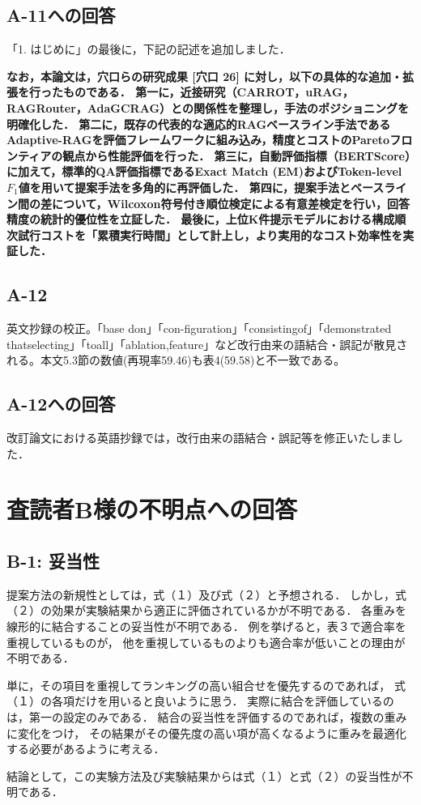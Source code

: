 \documentclass{jsarticle}
\begin{document}
\subsection*{A-11への回答}

「1. はじめに」の最後に，下記の記述を追加しました．

\textbf{なお，本論文は，穴口らの研究成果 [穴口 26] に対し，以下の具体的な追加・拡張を行ったものである．
第一に，近接研究（CARROT，uRAG，RAGRouter，AdaGCRAG）との関係性を整理し，手法のポジショニングを明確化した．
第二に，既存の代表的な適応的RAGベースライン手法であるAdaptive-RAGを評価フレームワークに組み込み，精度とコストのParetoフロンティアの観点から性能評価を行った．
第三に，自動評価指標（BERTScore）に加えて，標準的QA評価指標であるExact Match (EM)およびToken-level $F_1$値を用いて提案手法を多角的に再評価した．
第四に，提案手法とベースライン間の差について，Wilcoxon符号付き順位検定による有意差検定を行い，回答精度の統計的優位性を立証した．
最後に，上位K件提示モデルにおける構成順次試行コストを「累積実行時間」として計上し，より実用的なコスト効率性を実証した．}

\subsection*{A-12}
\begin{screen}
英文抄録の校正。「base don」「con-figuration」「consistingof」「demonstrated thatselecting」「toall」「ablation,feature」など改行由来の語結合・誤記が散見される。本文5.3節の数値(再現率59.46)も表4(59.58)と不一致である。
\end{screen}

\subsection*{A-12への回答}
改訂論文における英語抄録では，改行由来の語結合・誤記等を修正いたしました．

\newpage

\section*{査読者B様の不明点への回答}

\subsection*{B-1: 妥当性}
\begin{screen}
提案方法の新規性としては，式（１）及び式（２）と予想される．
しかし，式（２）の効果が実験結果から適正に評価されているかが不明である．
各重みを線形的に結合することの妥当性が不明である．
例を挙げると，表３で適合率を重視しているものが，
他を重視しているものよりも適合率が低いことの理由が不明である．

単に，その項目を重視してランキングの高い組合せを優先するのであれば，
式（１）の各項だけを用いると良いように思う．
実際に結合を評価しているのは，第一の設定のみである．
結合の妥当性を評価するのであれば，複数の重みに変化をつけ，
その結果がその優先度の高い項が高くなるように重みを最適化する必要があるように考える．

結論として，この実験方法及び実験結果からは式（１）と式（２）の妥当性が不明である．
\end{screen}
\end{document}
